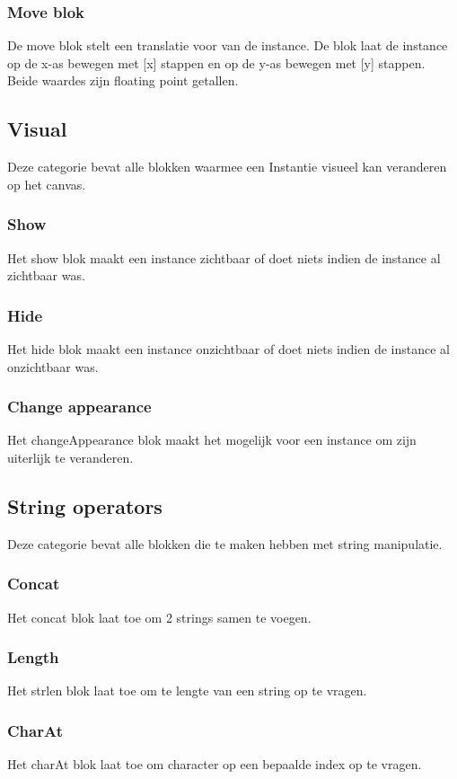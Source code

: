 \documentclass[]{article}
\begin{document}
\subsubsection{Move blok}
De move blok stelt een translatie voor van de instance. De blok laat de instance op de x-as bewegen met [x] stappen en op de y-as bewegen met [y] stappen. Beide waardes zijn floating point getallen.

\subsection{Visual}
Deze categorie bevat alle blokken waarmee een Instantie visueel kan veranderen op het canvas.
\subsubsection{Show}
Het show blok maakt een instance zichtbaar of doet niets indien de instance al zichtbaar was.
\subsubsection{Hide}
Het hide blok maakt een instance onzichtbaar of doet niets indien de instance al onzichtbaar was.
\subsubsection{Change appearance}
Het changeAppearance blok maakt het mogelijk voor een instance om zijn uiterlijk te veranderen.

\subsection{String operators}
Deze categorie bevat alle blokken die te maken hebben met string manipulatie.
\subsubsection{Concat}
Het concat blok laat toe om 2 strings samen te voegen.
\subsubsection{Length}
Het strlen blok laat toe om te lengte van een string op te vragen.
\subsubsection{CharAt}
Het charAt blok laat toe om character op een bepaalde index op te vragen.
\end{document}
